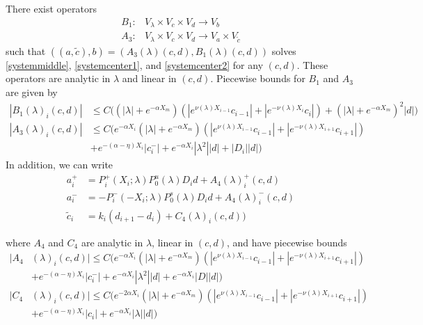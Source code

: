 \documentclass[thesis.tex]{subfiles}
\begin{document}
\begin{lemma}\label{Zinv2}
There exist operators
\begin{align*}
B_1: &V_\lambda \times V_c \times V_d \rightarrow V_b \\
A_3: &V_\lambda \times V_c \times V_d \rightarrow V_a \times V_{\tilde{c}} 
\end{align*}
such that $( (a, \tilde{c}) , b ) = ( A_3(\lambda)(c, d), B_1(\lambda)(c, d) )$ solves \eqref{systemmiddle}, \eqref{systemcenter1}, and \eqref{systemcenter2} for any $(c, d)$. These operators are analytic in $\lambda$ and linear in $(c,d)$. Piecewise bounds for $B_1$ and $A_3$ are given by
\begin{align}
|B_1(\lambda)_i(c, d)| &\leq C \Big( (|\lambda| + e^{-\alpha X_m})(|e^{\nu(\lambda)X_{i-1}} c_{i-1}| + |e^{-\nu(\lambda)X_i} c_i|) + (|\lambda| + e^{-\alpha X_m})^2 |d| \Big) \label{B1bound} \\
|A_3(\lambda)_i(c, d)|
&\leq C \Big(  
e^{-\alpha X_i} (|\lambda| + e^{-\alpha X_m})(|e^{\nu(\lambda)X_{i-1}} c_{i-1}| + |e^{-\nu(\lambda)X_{i+1}}c_{i+1}|) \nonumber \\
&+ e^{-(\alpha - \eta)X_i}|c_i^-| + e^{-\alpha X_i} |\lambda^2||d| + |D_i||d| \Big) \label{A3bound}
\end{align} 
In addition, we can write
\begin{align*}
a_i^+ &= P_i^+(X_i; \lambda) P_0^u(\lambda) D_i d + A_4(\lambda)_i^+(c, d) \\
a_i^- &= -P_i^-(-X_i; \lambda) P_0^s(\lambda) D_i d + A_4(\lambda)_i^-(c, d) \\
\tilde{c}_i &= k_i (d_{i+1} - d_i) + C_4(\lambda)_i(c, d) )
\end{align*}

where $A_4$ and $C_4$ are analytic in $\lambda$, linear in $(c, d)$, and have piecewise bounds
\begin{align}
|A_4&(\lambda)_i(c, d)|
\leq C \Big(  
e^{-\alpha X_i} (|\lambda| + e^{-\alpha X_m})(|e^{\nu(\lambda)X_{i-1}} c_{i-1}| + |e^{-\nu(\lambda)X_{i+1}}c_{i+1}|) \nonumber \\
&+ e^{-(\alpha - \eta)X_i}|c_i^-| + e^{-\alpha X_i} |\lambda^2||d| + e^{-\alpha X_i}|D||d| \Big)\label{A4bound} \\
|C_4&(\lambda)_i(c, d)|
\leq C \Big(  
e^{-2\alpha X_i} (|\lambda| + e^{-\alpha X_m})(|e^{\nu(\lambda)X_{i-1}} c_{i-1}| + |e^{-\nu(\lambda)X_{i+1}}c_{i+1}|) \\
&+ e^{-(\alpha - \eta)X_i}|c_i| + e^{-\alpha X_i}|\lambda||d| \Big)
\end{align}


\end{lemma}
\end{document}
